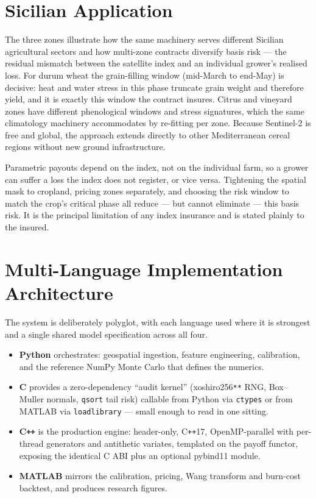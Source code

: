 \documentclass[11pt]{article}
\begin{document}
\section{Sicilian Application}
The three zones illustrate how the same machinery serves different Sicilian
agricultural sectors and how multi-zone contracts diversify basis risk --- the
residual mismatch between the satellite index and an individual grower's realised
loss. For durum wheat the grain-filling window (mid-March to end-May) is decisive:
heat and water stress in this phase truncate grain weight and therefore yield, and
it is exactly this window the contract insures. Citrus and vineyard zones have
different phenological windows and stress signatures, which the same climatology
machinery accommodates by re-fitting per zone. Because Sentinel-2 is free and
global, the approach extends directly to other Mediterranean cereal regions
without new ground infrastructure.

\begin{keybox}[title=Basis risk]
Parametric payouts depend on the index, not on the individual farm, so a grower
can suffer a loss the index does not register, or vice versa. Tightening the
spatial mask to cropland, pricing zones separately, and choosing the risk window
to match the crop's critical phase all reduce --- but cannot eliminate --- this
basis risk. It is the principal limitation of any index insurance and is stated
plainly to the insured.
\end{keybox}

\section{Multi-Language Implementation Architecture}
The system is deliberately polyglot, with each language used where it is
strongest and a single shared model specification across all four.

\begin{itemize}[leftmargin=1.4em,itemsep=2pt]
\item \textbf{Python} orchestrates: geospatial ingestion, feature engineering,
calibration, and the reference NumPy Monte Carlo that defines the numerics.
\item \textbf{C} provides a zero-dependency ``audit kernel'' (xoshiro256\texttt{**}
RNG, Box--Muller normals, \texttt{qsort} tail risk) callable from Python via
\texttt{ctypes} or from MATLAB via \texttt{loadlibrary} --- small enough to read in
one sitting.
\item \textbf{C\texttt{++}} is the production engine: header-only, C\texttt{++}17,
OpenMP-parallel with per-thread generators and antithetic variates, templated on
the payoff functor, exposing the identical C ABI plus an optional pybind11 module.
\item \textbf{MATLAB} mirrors the calibration, pricing, Wang transform and
burn-cost backtest, and produces research figures.
\end{itemize}
\end{document}
